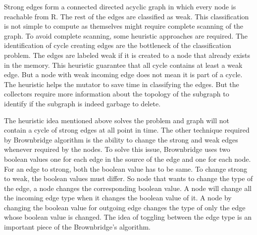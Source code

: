 Strong edges form a connected directed acyclic graph in which every node is reachable from R. The rest of the edges are classified as weak. This classification is not simple to compute as themselves might require complete scanning of the graph. To avoid complete scanning, some heuristic approaches are required. The identification of cycle creating edges are the bottleneck of the classification problem. The edges are  labeled weak if it is created to a node that already exists in the memory. This heuristic guarantee that all cycle contains at least a weak edge. But a node with weak incoming edge does not mean it is part of a cycle. The heuristic helps the mutator to save time in classifying the edges. But the collectors require more information about the topology of the subgraph to identify if the subgraph is indeed garbage to delete. 

The heuristic idea mentioned above solves the problem and graph will not contain a cycle of strong edges at all point in time. The other technique required by Brownbridge algorithm is the ability to change the strong and weak edges whenever required by the nodes. To solve this issue, Brownbridge uses two boolean values one for each edge in the source of the edge and one for each node. For an edge to strong, both the boolean value has to be same. To change strong to weak, the boolean values must differ. So node that wants to change the type of the edge, a node changes the corresponding boolean value. A node will change all the incoming edge type when it changes the boolean value of it. A node by changing the boolean value for outgoing edge changes the type of only the edge whose boolean value is changed. The idea of toggling between the edge type is an important piece of the Brownbridge's algorithm.

